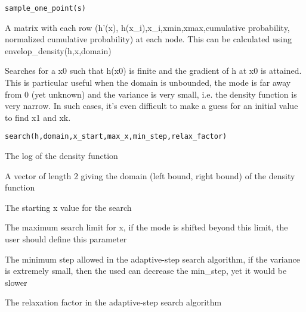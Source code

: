 \documentclass[a4paper]{book}
\begin{document}
%
\begin{Usage}
\begin{verbatim}
sample_one_point(s)
\end{verbatim}
\end{Usage}
%
\begin{Arguments}
\begin{ldescription}
\item[\code{s}] A matrix with each row (h'(x), h(x\_i),x\_i,xmin,xmax,cumulative probability, normalized cumulative probability) at each node. This can be calculated using envelop\_density(h,x,domain)
\end{ldescription}
\end{Arguments}
%
\begin{Description}\relax
Searches for a x0 such that h(x0) is finite and the gradient of h at x0 is attained. This is particular useful when the domain is unbounded, the mode is far away from 0 (yet unknown) and the variance is very small, i.e. the density function is very narrow. In such cases, it's even difficult to make a guess for an initial value to find x1 and xk.
\end{Description}
%
\begin{Usage}
\begin{verbatim}
search(h,domain,x_start,max_x,min_step,relax_factor)
\end{verbatim}
\end{Usage}
%
\begin{Arguments}
\begin{ldescription}
\item[\code{h}] The log of the density function

\item[\code{domain}] A vector of length 2 giving the domain (left bound, right bound) of the density function

\item[\code{x\_start}] The starting x value for the search

\item[\code{max\_x}] The maximum search limit for x, if the mode is shifted beyond this limit, the user should define this parameter

\item[\code{min\_step}] The minimum step allowed in the adaptive-step search algorithm, if the variance is extremely small, then the used can decrease the min\_step, yet it would be slower

\item[\code{relax\_factor}] The relaxation factor in the adaptive-step search algorithm
\end{ldescription}
\end{Arguments}
\end{document}
